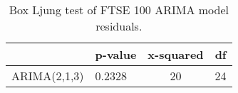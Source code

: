 \begin{table}[ht]
\centering
\caption[Box Ljung test of FTSE 100 ARIMA model residuals]{Box Ljung test of FTSE 100 ARIMA model residuals.} 
\label{tab:chp_ts:arima_res_rbox_l}
\begin{tabular}{llcc}
  \toprule  & p-value & x-squared & df \\ 
  \midrule ARIMA(2,1,3)                    & 0.2328 & 20 & 24 \\ 
   \bottomrule \end{tabular}
\end{table}

